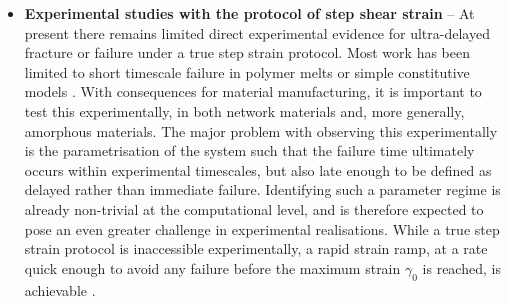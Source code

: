 \documentclass[asymmetricmargins]{library/duthesis}%
\begin{document}
\begin{itemize}
    \item {\bf Experimental studies with the protocol of step shear strain} -- At present there remains limited direct experimental evidence for ultra-delayed fracture or failure under a true step strain protocol. Most work has been limited to short timescale failure in polymer melts \cite{boukany_step_2009,barroso_evaluation_2002,einaga_stress_1973} or simple constitutive models \cite{moorcroft_shear_2014,moorcroft_criteria_2013,adams_nonmonotonic_2009}. With consequences for material manufacturing, it is important to test this experimentally, in both network materials and, more generally, amorphous materials. The major problem with observing this experimentally is the parametrisation of the system such that the failure time ultimately occurs within experimental timescales, but also late enough to be defined as delayed rather than immediate failure. Identifying such a parameter regime is already non-trivial at the computational level, and is therefore expected to pose an even greater challenge in experimental realisations. While a true step strain protocol is inaccessible experimentally, a rapid strain ramp, at a rate quick enough to avoid any failure before the maximum strain $\gamma_0$ is reached, is achievable \cite{barroso_evaluation_2002}. 
\end{itemize}
\end{document}
